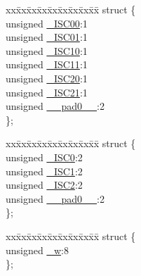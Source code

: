 \begin{DoxyCompactItemize}
\item 
\begin{tabbing}
xx\=xx\=xx\=xx\=xx\=xx\=xx\=xx\=xx\=\kill
struct \{\\
\>unsigned \hyperlink{union_____e_i_c_r_abits__t_a29dd9f71cf98c01f86368c683117d9e5}{\_ISC00}:1\\
\>unsigned \hyperlink{union_____e_i_c_r_abits__t_ad23462a0af371238c4837317aa638125}{\_ISC01}:1\\
\>unsigned \hyperlink{union_____e_i_c_r_abits__t_a7ede693280bdf47a326b0d9ea6622afd}{\_ISC10}:1\\
\>unsigned \hyperlink{union_____e_i_c_r_abits__t_af7d0c50aae9973b66dd6f50ac5c48ba2}{\_ISC11}:1\\
\>unsigned \hyperlink{union_____e_i_c_r_abits__t_aa68988705ad052dd276ca507a777753c}{\_ISC20}:1\\
\>unsigned \hyperlink{union_____e_i_c_r_abits__t_a68721495d127ebd9746cea6edd32d068}{\_ISC21}:1\\
\>unsigned \hyperlink{union_____e_i_c_r_abits__t_afe338fe7e01cf0d19e3acb22b9ce7ffa}{\_\_pad0\_\_}:2\\
\}; \\

\end{tabbing}\item 
\begin{tabbing}
xx\=xx\=xx\=xx\=xx\=xx\=xx\=xx\=xx\=\kill
struct \{\\
\>unsigned \hyperlink{union_____e_i_c_r_abits__t_a6e8d48b85c5c1f781879076d76f566d0}{\_ISC0}:2\\
\>unsigned \hyperlink{union_____e_i_c_r_abits__t_aaa24d647dc58afefd86e4f0826db2424}{\_ISC1}:2\\
\>unsigned \hyperlink{union_____e_i_c_r_abits__t_aa29a31a881d4a3003f875ee647d60839}{\_ISC2}:2\\
\>unsigned \hyperlink{union_____e_i_c_r_abits__t_afe338fe7e01cf0d19e3acb22b9ce7ffa}{\_\_pad0\_\_}:2\\
\}; \\

\end{tabbing}\item 
\begin{tabbing}
xx\=xx\=xx\=xx\=xx\=xx\=xx\=xx\=xx\=\kill
struct \{\\
\>unsigned \hyperlink{union_____e_i_c_r_abits__t_a44df575516c86af2141d8ba966b97db8}{\_w}:8\\
\}; \\

\end{tabbing}\end{DoxyCompactItemize}


